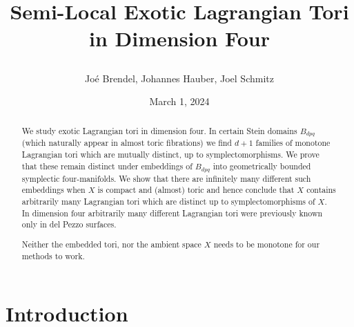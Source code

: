 \documentclass[12pt,a4paper,abstract=true,final]{scrartcl}
\begin{document}
\title{Semi-Local Exotic Lagrangian Tori in Dimension Four\\
\bigskip
{}\vspace{-0.5cm}}
\author{Joé Brendel, Johannes Hauber, Joel Schmitz}
\date{March 1, 2024}

\maketitle

\begin{abstract}
We study exotic Lagrangian tori in dimension four.
In certain Stein domains $B_{dpq}$ (which naturally appear in almost toric fibrations) we find $d+1$ families of monotone Lagrangian tori which are mutually distinct, up to symplectomorphisms.
We prove that these remain distinct under embeddings of $B_{dpq}$ into geometrically bounded symplectic four-manifolds.
We show that there are infinitely many different such embeddings when $X$ is compact and (almost) toric and hence conclude that $X$ contains arbitrarily many Lagrangian tori which are distinct up to symplectomorphisms of $X$.
In dimension four arbitrarily many different Lagrangian tori were previously known
only in del Pezzo surfaces.

Neither the embedded tori, nor the ambient space $X$ needs to be monotone for our methods to work. 
\end{abstract}

\section{Introduction}
\end{document}
